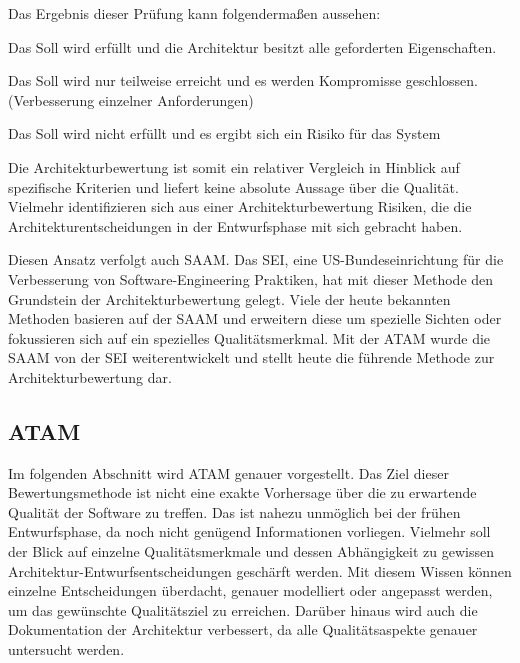 Das Ergebnis dieser Prüfung kann folgendermaßen aussehen\cite{Starke2015}:

\begin{description}[leftmargin=!,labelwidth=\widthof{\bfseries Soll $=$ Is}]
	\item[Soll $=$ Ist] 
	Das Soll wird erfüllt und die Architektur besitzt alle geforderten Eigenschaften.
	\item[Soll $\approx$ Ist] 
	Das Soll wird nur teilweise erreicht und es werden Kompromisse geschlossen. (Verbesserung einzelner Anforderungen)
	\item[Soll $\neq$ Ist] 
	Das Soll wird nicht erfüllt und es ergibt sich ein Risiko für das System
\end{description}

Die Architekturbewertung ist somit ein relativer Vergleich in Hinblick auf spezifische 
Kriterien und liefert keine absolute Aussage über die Qualität. Vielmehr identifizieren sich aus einer Architekturbewertung Risiken, die die Architekturentscheidungen in der Entwurfsphase mit sich gebracht haben. 

Diesen Ansatz verfolgt auch \ac{SAAM}. Das \ac{SEI}, eine US-Bundeseinrichtung für die Verbesserung von Software-Engineering Praktiken, hat mit dieser Methode den Grundstein der Architekturbewertung gelegt.
Viele der heute bekannten 
Methoden basieren auf der \ac{SAAM} und erweitern diese um spezielle Sichten oder fokussieren sich auf ein spezielles Qualitätsmerkmal. Mit der \ac{ATAM} wurde die \ac{SAAM} von der \ac{SEI} weiterentwickelt und stellt heute die führende Methode zur Architekturbewertung dar\cite{ATAM_SEI}.

\subsection{\acf*{ATAM}}

Im folgenden Abschnitt wird \ac{ATAM} genauer vorgestellt. Das Ziel dieser Bewertungsmethode ist nicht eine exakte Vorhersage über die 
zu erwartende Qualität der Software zu treffen. Das ist nahezu unmöglich bei der frühen Entwurfsphase, da noch nicht genügend Informationen 
vorliegen. Vielmehr soll der Blick auf einzelne Qualitätsmerkmale und dessen Abhängigkeit zu gewissen Architektur-Entwurfsentscheidungen geschärft 
werden\cite{Clements2000}. Mit diesem Wissen können einzelne Entscheidungen überdacht, genauer modelliert oder angepasst werden, um das gewünschte 
Qualitätsziel zu erreichen. Darüber hinaus wird auch die Dokumentation der Architektur verbessert, da alle Qualitätsaspekte genauer untersucht werden.


